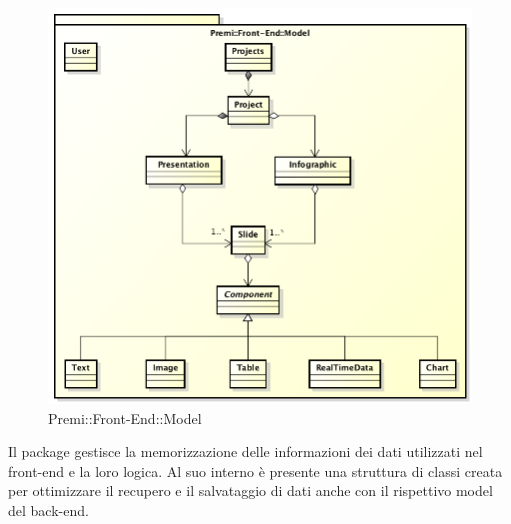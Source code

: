 \begin{figure}[h]
	\centering
	\includegraphics[width=0.7\linewidth]{img/premi_front_end_model}
	\caption[Premi::Front-End::Model]{Premi::Front-End::Model}
\end{figure}
Il package gestisce la memorizzazione delle informazioni dei dati utilizzati nel front-end e la loro logica. Al suo interno è presente una struttura di classi creata per ottimizzare il recupero e il salvataggio di dati anche con il rispettivo model del back-end.